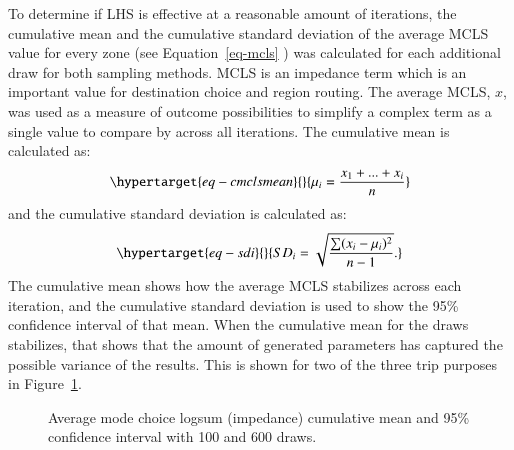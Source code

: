 \documentclass[
  letterpaper,
  authoryear,
  review,
  3p]{elsarticle}
\begin{document}
To determine if LHS is effective at a reasonable amount of iterations,
the cumulative mean and the cumulative standard deviation of the average
MCLS value for every zone (see Equation~\ref{eq-mcls} ) was calculated
for each additional draw for both sampling methods. MCLS is an impedance
term which is an important value for destination choice and region
routing. The average MCLS, \(x\), was used as a measure of outcome
possibilities to simplify a complex term as a single value to compare by
across all iterations. The cumulative mean is calculated as:
\begin{equation}\protect\hypertarget{eq-cmclsmean}{}{
\mu_i = \frac{x_1 + ... + x_i}{n}
}\label{eq-cmclsmean}\end{equation} and the cumulative standard
deviation is calculated as:
\begin{equation}\protect\hypertarget{eq-sdi}{}{
SD_i = \sqrt{\frac{\sum (x_i - \mu_i)^2 }{n-1}}.
}\label{eq-sdi}\end{equation} The cumulative mean shows how the average
MCLS stabilizes across each iteration, and the cumulative standard
deviation is used to show the 95\% confidence interval of that mean.
When the cumulative mean for the draws stabilizes, that shows that the
amount of generated parameters has captured the possible variance of the
results. This is shown for two of the three trip purposes in
Figure~\ref{fig-cm}.

\begin{figure}

\begin{minipage}[t]{\linewidth}

{\centering 


}

\end{minipage}%
\newline
\begin{minipage}[t]{\linewidth}

{\centering 


}

\end{minipage}%

\caption{\label{fig-cm}Average mode choice logsum (impedance) cumulative
mean and 95\% confidence interval with 100 and 600 draws.}

\end{figure}
\end{document}
